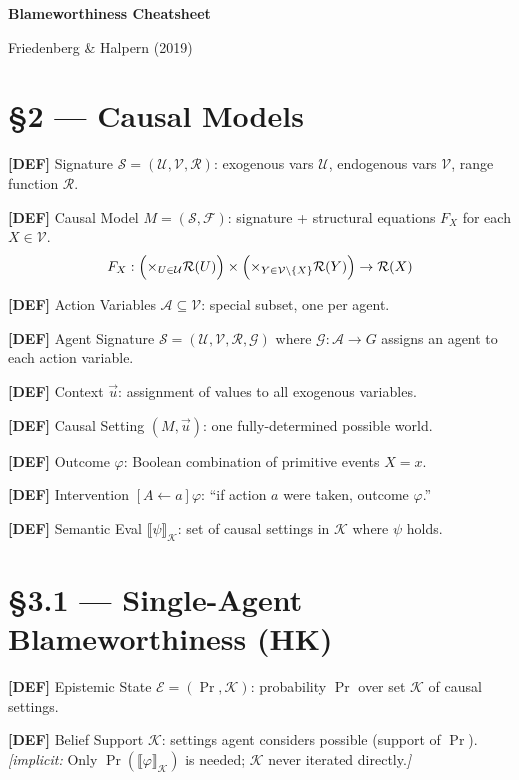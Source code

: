 \documentclass[10pt,a4paper]{article}
\newcommand{\DEF}[1]{\textcolor{defcol}{\textbf{[DEF]}}\; #1}
\newcommand{\impl}[1]{\textit{[implicit:} #1\textit{]}}
\begin{document}
{\centering\Large\bfseries Blameworthiness Cheatsheet\\[2pt]}
{\centering\small Friedenberg \& Halpern (2019)\par}
\vspace{4pt}

\section*{\S2 — Causal Models}

\DEF{Signature} $\mathcal{S} = (\mathcal{U}, \mathcal{V}, \mathcal{R})$: exogenous vars $\mathcal{U}$, endogenous vars $\mathcal{V}$, range function $\mathcal{R}$.

\DEF{Causal Model} $M = (\mathcal{S}, \mathcal{F})$: signature + structural equations $F_X$ for each $X \in \mathcal{V}$.
$$F_X : \Bigl(\times_{U \in \mathcal{U}} \mathcal{R}(U)\Bigr) \times \Bigl(\times_{Y \in \mathcal{V} \setminus \{X\}} \mathcal{R}(Y)\Bigr) \to \mathcal{R}(X)$$

\DEF{Action Variables} $\mathcal{A} \subseteq \mathcal{V}$: special subset, one per agent.

\DEF{Agent Signature} $\mathcal{S} = (\mathcal{U}, \mathcal{V}, \mathcal{R}, \mathcal{G})$ where $\mathcal{G}: \mathcal{A} \to G$ assigns an agent to each action variable.

\DEF{Context} $\vec{u}$: assignment of values to all exogenous variables.

\DEF{Causal Setting} $(M, \vec{u})$: one fully-determined possible world.

\DEF{Outcome} $\varphi$: Boolean combination of primitive events $X = x$.

\DEF{Intervention} $[A \leftarrow a]\varphi$: ``if action $a$ were taken, outcome $\varphi$.''

\DEF{Semantic Eval} $\llbracket\psi\rrbracket_{\mathcal{K}}$: set of causal settings in $\mathcal{K}$ where $\psi$ holds.

\section*{\S3.1 — Single-Agent Blameworthiness (HK)}

\DEF{Epistemic State} $\mathcal{E} = (\Pr, \mathcal{K})$: probability $\Pr$ over set $\mathcal{K}$ of causal settings.

\DEF{Belief Support} $\mathcal{K}$: settings agent considers possible (support of $\Pr$). \impl{Only $\Pr(\llbracket\varphi\rrbracket_\mathcal{K})$ is needed; $\mathcal{K}$ never iterated directly.}
\end{document}
